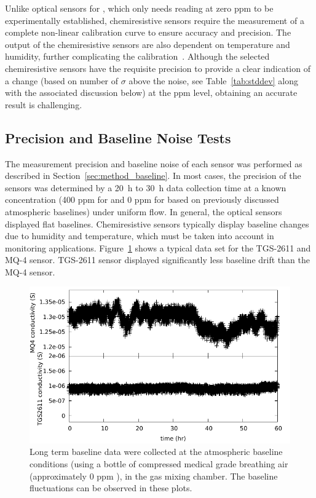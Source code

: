 \documentclass[sensors,article,submit,moreauthors,pdftex]{Definitions/mdpi}
\begin{document}
			Unlike optical sensors for , which only needs reading at zero ppm to be experimentally established, chemiresistive sensors require the measurement of a complete non-linear calibration curve to ensure accuracy and precision.
			The output of the chemiresistive sensors are also dependent on temperature and humidity, further complicating the calibration~\cite{benkstein_analytical_2014}.
			Although the selected chemiresistive sensors have the requisite precision to provide a clear indication of a change (based on number of $\sigma$ above the noise, see Table~\ref{tab:stddev} along with the associated discussion below) at the ppm level, obtaining an accurate result is challenging.
			

		\subsection{Precision and Baseline Noise Tests}
			\label{sec:main_baseline}
			
			The measurement precision and baseline noise of each sensor was performed as described in Section~\ref{sec:method_baseline}.
			In most cases, the precision of the sensors was determined by a \SI{20}{\hour} to \SI{30}{\hour} data collection time at a known concentration (400 ppm for  and 0 ppm for  based on previously discussed atmospheric baselines) under uniform flow.
			In general, the optical sensors displayed flat baselines.
			Chemiresistive sensors typically display baseline changes due to humidity and temperature, which must be taken into account in monitoring applications.
			Figure~\ref{fig:MQ4TGSbaseline} shows a typical data set for the TGS-2611 and MQ-4 sensor.
			TGS-2611 sensor displayed significantly less baseline drift than the MQ-4 sensor.
			
			
			\begin{figure}[!t]
				\centering
				\includegraphics[width=\columnwidth]{honey5.pdf}
				\caption{Long term baseline data were collected at the atmospheric baseline conditions (using a bottle of compressed medical grade breathing air (approximately 0 ppm ), in the gas mixing chamber.
				The baseline fluctuations can be observed in these plots.}
				\label{fig:MQ4TGSbaseline}
			\end{figure}
			
\end{document}
